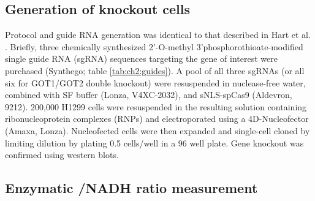 \subsection{Generation of knockout cells}
Protocol and guide RNA generation was identical to that described in Hart et al. \cite{Hart2023-gp}.
Briefly, three chemically synthesized 2'-O-methyl 3’phosphorothioate-modified single guide RNA (sgRNA) sequences targeting the gene of interest were purchased (Synthego; table \ref{tab:ch2:guides}).
A pool of all three sgRNAs (or all six for GOT1/GOT2 double knockout) were resuspended in nuclease-free water, combined with SF buffer (Lonza, V4XC-2032), and sNLS-spCas9 (Aldevron, 9212).
200,000 H1299 cells were resuspended in the resulting solution containing ribonucleoprotein complexes (RNPs) and electroporated using a 4D-Nucleofector (Amaxa, Lonza).
Nucleofected cells were then expanded and single-cell cloned by limiting dilution by plating 0.5 cells/well in a 96 well plate.
Gene knockout was confirmed using western blots.



\subsection{Enzymatic \NAD{}/NADH ratio measurement}




